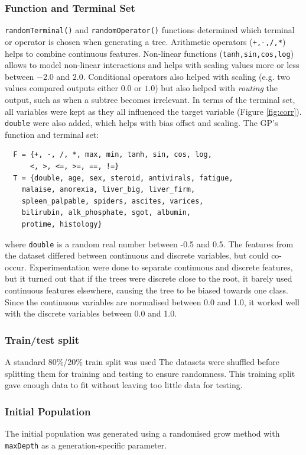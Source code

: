 \documentclass{article}
\begin{document}
\subsubsection{Function and Terminal Set}
\texttt{randomTerminal()} and \texttt{randomOperator()} functions determined which terminal or operator is chosen when generating a tree. Arithmetic operators (\texttt{+,-,/,*}) helps to combine continuous features. Non-linear functions (\texttt{tanh,sin,cos,log}) allows to model non-linear interactions and helps with scaling values more or less between \(-2.0\) and \(2.0\). Conditional operators also helped with scaling (e.g. two values compared outputs either \(0.0\) or \(1.0\)) but also helped with \emph{routing} the output, such as when a subtree becomes irrelevant.
In terms of the terminal set, all variables were kept as they all influenced the target variable (Figure \ref{fig:corr}). \texttt{double} were also added, which helps with bias offset and scaling. The GP's function and terminal set:
\begin{verbatim}
  F = {+, -, /, *, max, min, tanh, sin, cos, log, 
      <, >, <=, >=, ==, !=}
  T = {double, age, sex, steroid, antivirals, fatigue,
    malaise, anorexia, liver_big, liver_firm,
    spleen_palpable, spiders, ascites, varices,
    bilirubin, alk_phosphate, sgot, albumin,
    protime, histology}
\end{verbatim}
where \texttt{double} is a random real number between -0.5 and 0.5. The features from the dataset differed between continuous and discrete variables, but could co-occur. Experimentation were done to separate continuous and discrete features, but it turned out that if the trees were discrete close to the root, it barely used continuous features elsewhere, causing the tree to be biased towards one class. Since the continuous variables are normalised between 0.0 and 1.0, it worked well with the discrete variables between 0.0 and 1.0.

\subsubsection{Train/test split}
A standard 80\%/20\% train split was used The datasets were shuffled before splitting them for training and testing to ensure randomness. This training split gave enough data to fit without leaving too little data for testing.

\subsubsection{Initial Population}
\label{initPop}
The initial population was generated using a randomised grow method with \texttt{maxDepth} as a generation-specific parameter.
\end{document}
